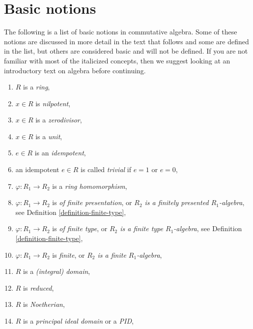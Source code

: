 \section{Basic notions}
\label{section-rings-basic}

\noindent
The following is a list of basic notions in commutative algebra. Some of these
notions are discussed in more detail in the text that follows and some are
defined in the list, but others are considered basic and will not be defined.
If you are not familiar with most of the italicized concepts, then we suggest
looking at an introductory text on algebra before continuing.

\begin{enumerate}
\item $R$ is a {\it ring},
\label{item-ring}
\item $x\in R$ is {\it nilpotent},
\label{item-ring-element-nilpotent}
\item $x\in R$ is a {\it zerodivisor},
\label{item-ring-element-zerodivisor}
\item $x\in R$ is a {\it unit},
\label{item-ring-element-unit}
\item $e \in R$ is an {\it idempotent},
\label{item-ring-element-idempotent}
\item an idempotent $e \in R$ is called {\it trivial} if $e = 1$ or $e = 0$,
\label{item-idempotent-trivial}
\item $\varphi : R_1 \to R_2$ is a {\it ring homomorphism},
\label{item-ring-homomorphism}
\item
\label{item-ring-homomorphism-finite-presentation}
$\varphi : R_1 \to R_2$ is {\it of finite presentation}, or
{\it $R_2$ is a finitely presented $R_1$-algebra},
see Definition \ref{definition-finite-type},
\item
\label{item-ring-homomorphism-finite-type}
$\varphi : R_1 \to R_2$ is {\it of finite type}, or
{\it $R_2$ is a finite type $R_1$-algebra},
see Definition \ref{definition-finite-type},
\item
\label{item-ring-homomorphism-finite}
$\varphi : R_1 \to R_2$ is {\it finite}, or
{\it $R_2$ is a finite $R_1$-algebra},
\item $R$ is a {\it (integral) domain},
\label{item-ring-domain}
\item $R$ is {\it reduced},
\label{item-ring-reduced}
\item $R$ is {\it Noetherian},
\label{item-ring-Noetherian}
\item $R$ is a {\it principal ideal domain} or a {\it PID},
\label{item-ring-PID}

\end{enumerate}
